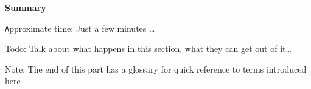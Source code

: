 \vspace*{2cm}

{\Huge \bfseries Summary}
\vspace{0.5cm}

{\small \texttt Approximate time: Just a few minutes \ldots}

Todo: Talk about what happens in this section, what they can get out of it\ldots

Note: The end of this part has a glossary for quick reference to terms introduced here
